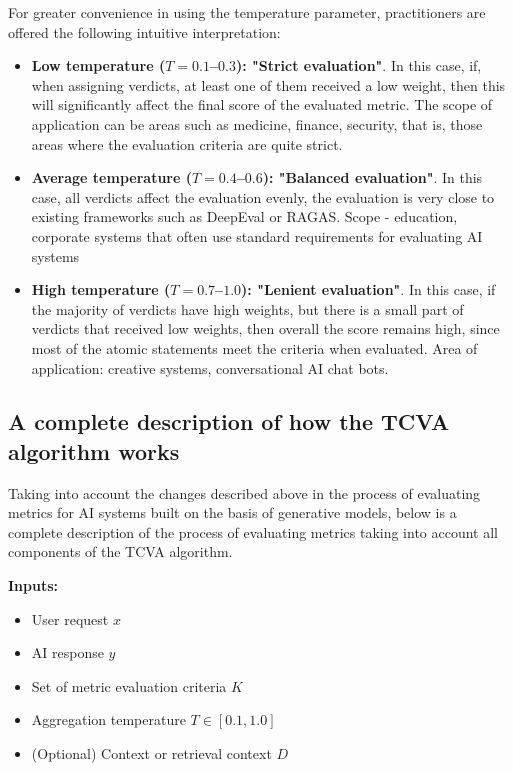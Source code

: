 \documentclass[sn-basic]{sn-jnl}
\theoremstyle{thmstyleone}%
\theoremstyle{thmstyletwo}%
\theoremstyle{thmstylethree}%
\begin{document}
For greater convenience in using the temperature parameter, practitioners are offered the following intuitive interpretation:

\begin{itemize} 
\item \textbf{Low temperature ($T = 0.1$--$0.3$): "Strict evaluation"}. In this case, if, when assigning verdicts, at least one of them received a low weight, then this will significantly affect the final score of the evaluated metric. The scope of application can be areas such as medicine, finance, security, that is, those areas where the evaluation criteria are quite strict. 
\item \textbf{Average temperature ($T = 0.4$--$0.6$): "Balanced evaluation"}. In this case, all verdicts affect the evaluation evenly, the evaluation is very close to existing frameworks such as DeepEval or RAGAS. Scope - education, corporate systems that often use standard requirements for evaluating AI systems 
\item \textbf{High temperature ($T = 0.7$--$1.0$): "Lenient evaluation"}. In this case, if the majority of verdicts have high weights, but there is a small part of verdicts that received low weights, then overall the score remains high, since most of the atomic statements meet the criteria when evaluated. Area of application: creative systems, conversational AI chat bots. 
\end{itemize}

\subsection{A complete description of how the TCVA algorithm works}

Taking into account the changes described above in the process of evaluating metrics for AI systems built on the basis of generative models, below is a complete description of the process of evaluating metrics taking into account all components of the TCVA algorithm.

\textbf{Inputs:}
\begin{itemize}
\item User request $x$
\item AI response $y$
\item Set of metric evaluation criteria $K$
\item Aggregation temperature $T \in [0.1, 1.0]$
\item (Optional) Context or retrieval context $D$
\end{itemize}
\end{document}
